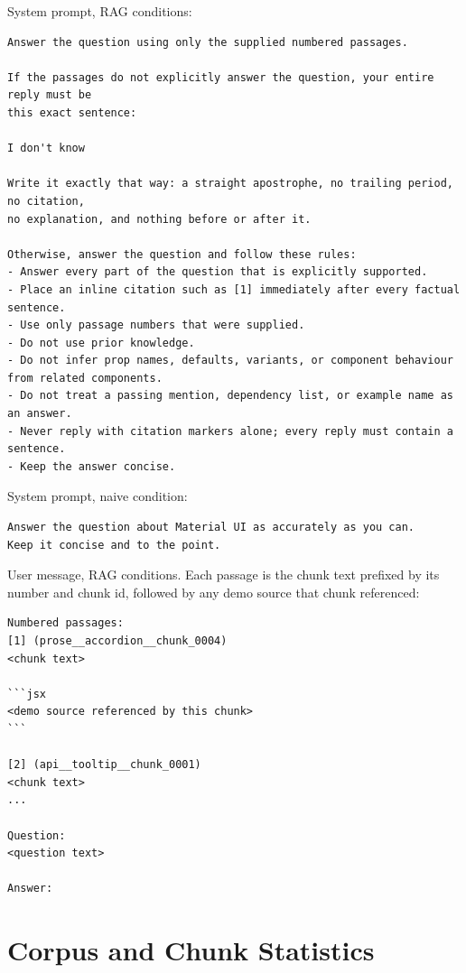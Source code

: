\documentclass[10pt,a4paper]{article}
\begin{document}
System prompt, RAG conditions:

\begin{lstlisting}
Answer the question using only the supplied numbered passages.

If the passages do not explicitly answer the question, your entire reply must be
this exact sentence:

I don't know

Write it exactly that way: a straight apostrophe, no trailing period, no citation,
no explanation, and nothing before or after it.

Otherwise, answer the question and follow these rules:
- Answer every part of the question that is explicitly supported.
- Place an inline citation such as [1] immediately after every factual sentence.
- Use only passage numbers that were supplied.
- Do not use prior knowledge.
- Do not infer prop names, defaults, variants, or component behaviour from related components.
- Do not treat a passing mention, dependency list, or example name as an answer.
- Never reply with citation markers alone; every reply must contain a sentence.
- Keep the answer concise.
\end{lstlisting}

System prompt, naive condition:

\begin{lstlisting}
Answer the question about Material UI as accurately as you can.
Keep it concise and to the point.
\end{lstlisting}

User message, RAG conditions. Each passage is the chunk text prefixed by its
number and chunk id, followed by any demo source that chunk referenced:

\begin{lstlisting}
Numbered passages:
[1] (prose__accordion__chunk_0004)
<chunk text>

```jsx
<demo source referenced by this chunk>
```

[2] (api__tooltip__chunk_0001)
<chunk text>
...

Question:
<question text>

Answer:
\end{lstlisting}

\section{Corpus and Chunk Statistics}
\label{app:corpus}
\end{document}
